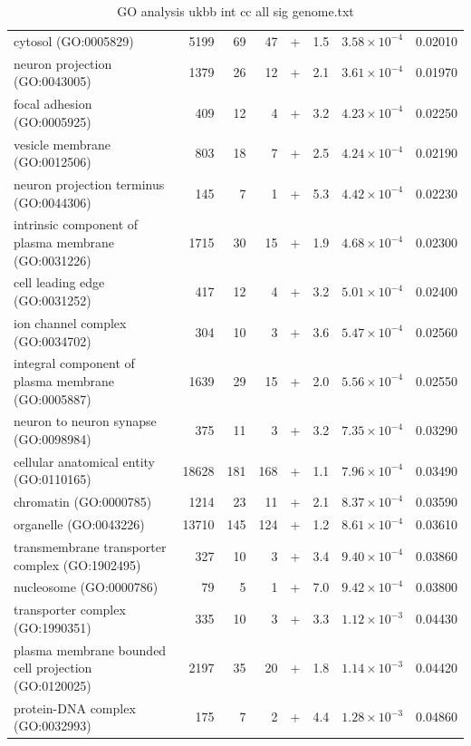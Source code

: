 \begin{table}[ht]
\begin{adjustbox}{width=\textwidth}
\begin{tabular}{lrrrlrrr}
  cytosol (GO:0005829) & 5199 & 69 & 47 & + & 1.5 & $3.58 \times 10^{-4}$ & 0.02010 \\ 
  neuron projection (GO:0043005) & 1379 & 26 & 12 & + & 2.1 & $3.61 \times 10^{-4}$ & 0.01970 \\ 
  focal adhesion (GO:0005925) & 409 & 12 & 4 & + & 3.2 & $4.23 \times 10^{-4}$ & 0.02250 \\ 
  vesicle membrane (GO:0012506) & 803 & 18 & 7 & + & 2.5 & $4.24 \times 10^{-4}$ & 0.02190 \\ 
  neuron projection terminus (GO:0044306) & 145 & 7 & 1 & + & 5.3 & $4.42 \times 10^{-4}$ & 0.02230 \\ 
  intrinsic component of plasma membrane (GO:0031226) & 1715 & 30 & 15 & + & 1.9 & $4.68 \times 10^{-4}$ & 0.02300 \\ 
  cell leading edge (GO:0031252) & 417 & 12 & 4 & + & 3.2 & $5.01 \times 10^{-4}$ & 0.02400 \\ 
  ion channel complex (GO:0034702) & 304 & 10 & 3 & + & 3.6 & $5.47 \times 10^{-4}$ & 0.02560 \\ 
  integral component of plasma membrane (GO:0005887) & 1639 & 29 & 15 & + & 2.0 & $5.56 \times 10^{-4}$ & 0.02550 \\ 
  neuron to neuron synapse (GO:0098984) & 375 & 11 & 3 & + & 3.2 & $7.35 \times 10^{-4}$ & 0.03290 \\ 
  cellular anatomical entity (GO:0110165) & 18628 & 181 & 168 & + & 1.1 & $7.96 \times 10^{-4}$ & 0.03490 \\ 
  chromatin (GO:0000785) & 1214 & 23 & 11 & + & 2.1 & $8.37 \times 10^{-4}$ & 0.03590 \\ 
  organelle (GO:0043226) & 13710 & 145 & 124 & + & 1.2 & $8.61 \times 10^{-4}$ & 0.03610 \\ 
  transmembrane transporter complex (GO:1902495) & 327 & 10 & 3 & + & 3.4 & $9.40 \times 10^{-4}$ & 0.03860 \\ 
  nucleosome (GO:0000786) & 79 & 5 & 1 & + & 7.0 & $9.42 \times 10^{-4}$ & 0.03800 \\ 
  transporter complex (GO:1990351) & 335 & 10 & 3 & + & 3.3 & $1.12 \times 10^{-3}$ & 0.04430 \\ 
  plasma membrane bounded cell projection (GO:0120025) & 2197 & 35 & 20 & + & 1.8 & $1.14 \times 10^{-3}$ & 0.04420 \\ 
  protein-DNA complex (GO:0032993) & 175 & 7 & 2 & + & 4.4 & $1.28 \times 10^{-3}$ & 0.04860 \\ 
   \hline
\end{tabular}
\end{adjustbox}
\caption{GO analysis ukbb int cc all sig genome.txt} 
\label{tab:GO analysis ukbb_int_cc_all_sig_genome.txt}
\end{table}



